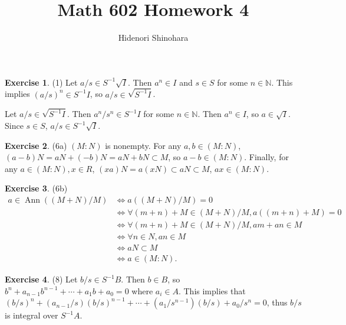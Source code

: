 \documentclass[12pt, psamsfonts]{amsart}
\theoremstyle{definition}
\newtheorem*{exer}{Exercise}
\theoremstyle{remark}
\DeclareMathOperator{\Ann}{Ann}
\numberwithin{equation}{section}
\begin{document}
\title{Math 602 Homework 4}
\author{Hidenori Shinohara}
\maketitle

\begin{exer}{(1)}
  Let $a / s \in S^{-1}\sqrt{I}$.
  Then $a^n \in I$ and $s \in S$ for some $n \in \mathbb{N}$.
  This implies $(a / s)^n \in S^{-1}I$, so $a / s \in \sqrt{S^{-1}I}$.

  Let $a / s \in \sqrt{S^{-1}I}$.
  Then $a^n / s^n \in S^{-1}I$ for some $n \in \mathbb{N}$.
  Then $a^n \in I$, so $a \in \sqrt{I}$.
  Since $s \in S$, $a / s \in S^{-1}\sqrt{I}$.
\end{exer}

\begin{exer}{(6a)}
  $(M:N)$ is nonempty.
  For any $a, b \in (M:N)$, $(a - b)N = aN + (-b)N = aN + bN \subset M$, so $a - b \in (M:N)$.
  Finally, for any $a \in (M:N), x \in R$, $(xa)N = a(xN) \subset aN \subset M$, $ax \in (M:N)$.
\end{exer}

\begin{exer}{(6b)}
  $ $
  \begin{align*}
    a \in \Ann((M + N) / M)
      &\iff a((M + N) / M) = 0 \\
      &\iff \forall (m + n) + M \in (M + N) / M, a((m + n) + M) = 0 \\
      &\iff \forall (m + n) + M \in (M + N) / M, am + an \in M \\
      &\iff \forall n \in N, an \in M \\
      &\iff aN \subset M \\
      &\iff a \in (M:N).
  \end{align*}
\end{exer}

\begin{exer}{(8)}
  Let $b / s \in S^{-1}B$.
  Then $b \in B$, so $b^n + a_{n - 1}b^{n - 1} + \cdots + a_1b + a_0 = 0$ where $a_i \in A$.
  This implies that $(b / s)^n + (a_{n - 1} / s)(b / s)^{n - 1} + \cdots + (a_1 / s^{n - 1})(b / s) + a_0 / s^n = 0$, thus $b / s$ is integral over $S^{-1}A$.
\end{exer}
\end{document}
